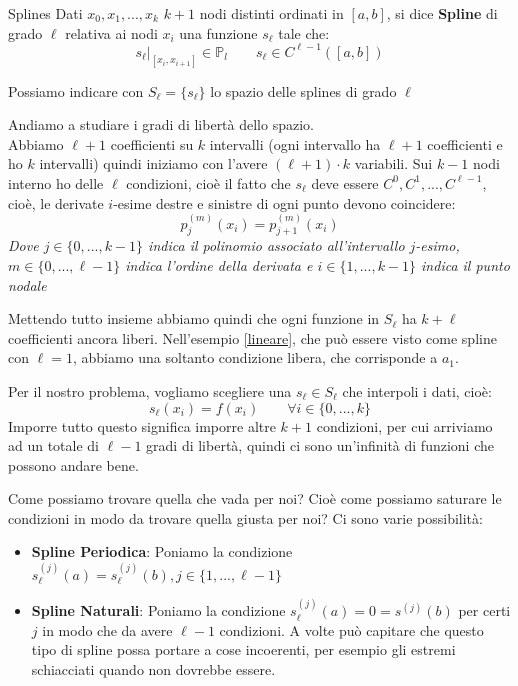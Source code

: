 \documentclass[11pt,a4paper,twoside]{article}
\theoremstyle{definition}
\begin{document}
\begin{defn}{Splines}{}
	Dati $x_0,x_1,...,x_{k}$ $k+1$ nodi distinti ordinati in $[a,b]$, si dice \textbf{Spline} di grado $\ell$ relativa ai nodi $x_i$ una funzione $s_\ell$ tale che:
	\[ \left. s_\ell\right|_{[x_i, x_{i+1}]} \in \mathbb P_l\qquad s_\ell \in C^{\ell-1}([a,b]) \]
\end{defn}

Possiamo indicare con $S_\ell = \{s_\ell\}$ lo spazio delle splines di grado $\ell$

Andiamo a studiare i gradi di libertà dello spazio.\\
Abbiamo $\ell +1$ coefficienti su $k$ intervalli (ogni intervallo ha $\ell+1$ coefficienti e ho $k$ intervalli) quindi iniziamo con l'avere $(\ell + 1)\cdot k$ variabili. Sui $k-1$ nodi interno ho delle $\ell$ condizioni, cioè il fatto che $s_\ell$ deve essere $C^0, C^1,...,C^{\ell-1}$, cioè, le derivate $i$-esime destre e sinistre di ogni punto devono coincidere:
\[ p^{(m)}_j(x_i) = p^{(m)}_{j+1}(x_i) \]
\textit{Dove $j \in \{0,...,k-1\}$ indica il polinomio associato all'intervallo $j$-esimo, $m \in \{0,...,\ell-1\}$ indica l'ordine della derivata e $i \in \{1,...,k-1\}$ indica il punto nodale}

Mettendo tutto insieme abbiamo quindi che ogni funzione in $S_\ell$ ha $k + \ell$ coefficienti ancora liberi. Nell'esempio \ref{lineare}, che può essere visto come spline con $\ell = 1$, abbiamo una soltanto condizione libera, che corrisponde a $a_1$.

Per il nostro problema, vogliamo scegliere una $s_\ell \in S_\ell$ che interpoli i dati, cioè:
\[ s_\ell(x_i) = f(x_i)\qquad \forall i \in \{0,...,k\} \]
Imporre tutto questo significa imporre altre $k+1$ condizioni, per cui arriviamo ad un totale di $\ell-1$ gradi di libertà, quindi ci sono un'infinità di funzioni che possono andare bene.

Come possiamo trovare quella che vada per noi? Cioè come possiamo saturare le condizioni in modo da trovare quella giusta per noi? Ci sono varie possibilità:
\begin{itemize}
	\item \textbf{Spline Periodica}: Poniamo la condizione $s^{(j)}_\ell(a) = s_\ell^{(j)}(b), j \in \{1,...,\ell-1\}$
	\item \textbf{Spline Naturali}: Poniamo la condizione $s^{(j)}_\ell(a) = 0 = s^{(j)}(b)$ per certi $j$ in modo che da avere $\ell-1$ condizioni. A volte può capitare che questo tipo di spline possa portare a cose incoerenti, per esempio gli estremi schiacciati quando non dovrebbe essere.
\end{itemize}
\end{document}
